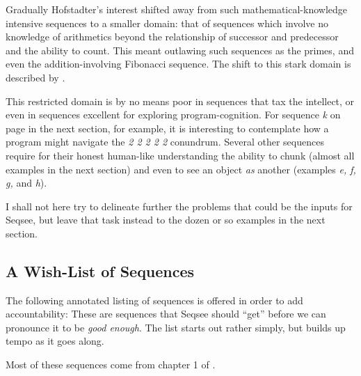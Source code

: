 \documentclass[letterpaper]{article}
\begin{document}
Gradually Hofstadter's interest shifted away from such mathematical-knowledge intensive sequences to a smaller domain: that of sequences which involve no knowledge of arithmetics beyond the relationship of successor and predecessor and the ability to count. This meant outlawing such sequences as the primes, and even the addition-involving Fibonacci sequence. The shift to this stark domain is described by .

This restricted domain is by no means poor in sequences that tax the intellect, or even in sequences excellent for exploring program-cognition. For sequence \emph{k} on page \pageref{seq:k} in the next section, for example, it is interesting to contemplate how a program might navigate the \emph{2 2 2 2 2} conundrum. Several other sequences require for their honest human-like understanding the ability to chunk (almost all examples in the next section) and even to see an object \emph{as} another (examples \emph{e, f, g, } and \emph{h}).

I shall not here try to delineate further the problems that could be the inputs for Seqsee, but leave that task instead to the dozen or so examples in the next section.

\subsection{A Wish-List of Sequences}
\label{sec:list}

The following annotated listing of sequences is offered in order to add accountability: These are sequences that Seqsee should ``get'' before we can pronounce it to be \emph{good enough}. The list starts out rather simply, but builds up tempo as it goes along.

Most of these sequences come from chapter 1 of .
\end{document}
